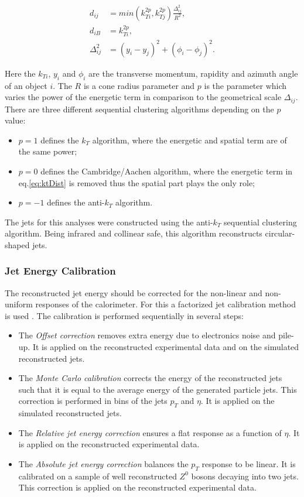 \begin{align}
 d_{ij} & = min(k_{Ti}^{2p}, k_{Tj}^{2p}) \frac{\Delta_{ij}^{2}}{R^{2}},\label{eq:ktDist} \\
 d_{iB} & = k_{Ti}^{2p}, \\
 \Delta_{ij}^{2} & = (y_{i} - y_{j})^{2} + (\phi_{i} - \phi_{j})^{2}.
\end{align}

Here the $k_{Ti}$, $y_{i}$ and $\phi_i$ are the transverse momentum, rapidity and azimuth angle of an object $i$. The $R$ is a cone radius parameter and 
$p$ is the parameter which varies the power of the energetic term in comparison to the geometrical scale $\Delta_{ij}$.
There are three different sequential clustering algorithms depending on the $p$ value:

\begin{itemize}
 \item $p = 1$ defines the $k_{T}$ algorithm, where the energetic and spatial term are of the same power;
 \item $p = 0$ defines the Cambridge/Aachen algorithm, where the energetic term in eq.\ref{eq:ktDist} is removed thus the spatial part plays the only role;
 \item $p = -1$ defines the anti-$k_{T}$ algorithm.
\end{itemize}

The jets for this analyses were constructed using the anti-$k_{T}$ sequential clustering algorithm. Being infrared and collinear safe, this algorithm reconstructs 
circular-shaped jets.

\subsubsection{Jet Energy Calibration}\label{ssec:JCal}

The reconstructed jet energy should be corrected for the non-linear and non-uniform responses of the calorimeter. For this a factorized jet calibration
method is used \cite{2011JInst...611002C}. The calibration is performed sequentially in several steps:

\begin{itemize}
 \item The \textit{Offset correction} removes extra energy due to electronics noise and pile-up. It is applied on the reconstructed experimental data and 
 on the simulated reconstructed jets.
 \item The \textit{Monte Carlo calibration} corrects the energy of the reconstructed jets such that it is equal to the average energy of the generated 
 particle jets. This correction is performed in bins of the jets $p_{T}$ and $\eta$. It is applied on the simulated reconstructed jets.
 \item The \textit{Relative jet energy correction} ensures a flat response as a function of $\eta$. It is applied on the reconstructed experimental data.
 \item The \textit{Absolute jet energy correction} balances the $p_{T}$ response to be linear. It is calibrated on a sample of well reconstructed $Z^{0}$ bosons 
 decaying into two jets. This correction is applied on the reconstructed experimental data.
\end{itemize}

